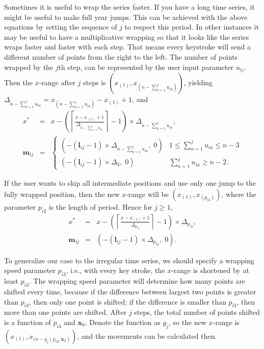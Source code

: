 \documentclass[12pt]{article}
\begin{document}
Sometimes it is useful to wrap the series faster. If you have
a long time series, it might be useful to make full year jumps.
This can be achieved with the above equations by setting the
sequence of $j$ to respect this period. In other instances it
may be useful to have a multiplicative wrapping so that it
looks like the series wraps faster and faster with each step.
That means every keystroke will send a different number of
points from the right to the left. The number of points
wrapped by the $j$th step, can be represented by the user
input parameter $u_{ij}$. Then the $x$-range after $j$ steps
is $(x_{(1)}, x_{(n-\sum_{a=1}^j u_{ia})})$, yielding
$\Delta_{n-\sum_{a=1}^j u_{ia}}=x_{(n-\sum_{a=1}^j u_{ia})}-x_{(1)}+1$, and
\begin{eqnarray*}
x^* & = & x-\left(\left\lceil \frac{x-x_{(1)}+1}{\Delta_{n-\sum_{a=1}^j u_{ia}}}\right\rceil -1\right)\times\Delta_{n-\sum_{a=1}^j u_{ia}}, \\
\mathbf{m}{}_{ij} & = & \begin{cases}
(-(\mathbf{l}{}_{ij} -1)\times\Delta_{n-\sum_{a=1}^j u_{ia}}, \; 0) & 1\leq \sum_{a=1}^j u_{ia} \leq n-3 \\
(-(\mathbf{l}{}_{ij} -1)\times\Delta_3, \; 0) & \sum_{a=1}^j u_{ia}\ge n-2.
\end{cases}
\end{eqnarray*}

If the user wants to skip all intermediate positions and use
only one jump to the fully wrapped position, %
then the new $x$-range will be $(x_{(1)}, x_{(p_{i2})})$, where
the parameter $p_{i2}$ is the length of period. Hence for $j\ge 1$,
\begin{eqnarray*}
x^* & = & x-\left(\left\lceil \frac{x-x_{(1)}+1}{\Delta_{p_{i2}}}\right\rceil -1\right)\times\Delta_{p_{i2}}, \\
\mathbf{m}{}_{ij} & = &
(-(\mathbf{l}{}_{ij} -1)\times\Delta_{p_{i2}}, \; 0).
\end{eqnarray*}

To generalize our case to the irregular time series, we
should specify a wrapping speed parameter $p_{i3}$, i.e.,
with every key stroke, the $x$-range is shortened by at
least $p_{i3}$. The wrapping speed parameter will determine
how many points are shifted every time, because if the
difference between largest two points is greater than
$p_{i3}$, then only one point is shifted; if the difference
is smaller than $p_{i3}$, then more than one points are
shifted. After $j$ steps, the total number of points
shifted is a function of $p_{i3}$ and $\mathbf{x}_0$.
Denote the function as $g_j$, so the new $x$-range is
$(x_{(1)},x_{(n-g_j(p_{i3},\mathbf{x}_0)})$, and the
movements can be calculated then.
\end{document}

